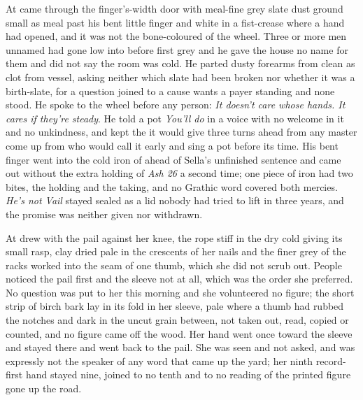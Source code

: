 At   came through the finger's-width door with meal-fine grey slate dust ground small as meal past his bent little finger and white in a fist-crease where a hand had opened, and it was not the bone-coloured  of the wheel. Three or more men unnamed had gone low into  before first grey and he gave the house no name for them and did not say the room was cold. He parted dusty forearms from clean as clot from vessel, asking neither which slate had been broken nor whether it was a birth-slate, for a question joined to a cause wants a payer standing and none stood. He spoke to the wheel before any person: \emph{It doesn't care whose hands. It cares if they're steady}. He told a pot \emph{You'll do} in a voice with no welcome in it and no unkindness, and kept the  it would give three turns ahead from any master come up from  who would call it early and sing a pot before its time. His bent finger went into the cold iron of  ahead of Sella's unfinished sentence and came out without the extra holding of \emph{Ash 26} a second time; one piece of iron had two bites, the holding and the taking, and no Grathic word covered both mercies. \emph{He's not Vail} stayed sealed as a lid nobody had tried to lift in three years, and the promise was neither given nor withdrawn.

At   drew with the pail against her knee, the rope stiff in the dry cold giving its small rasp, clay dried pale in the crescents of her nails and the finer grey of the racks worked into the seam of one thumb, which she did not scrub out. People noticed the pail first and the sleeve not at all, which was the order she preferred. No question was put to her this morning and she volunteered no figure; the short strip of birch bark lay in its fold in her sleeve, pale where a thumb had rubbed the notches and dark in the uncut grain between, not taken out, read, copied or counted, and no figure came off the wood. Her hand went once toward the sleeve and stayed there and went back to the pail. She was seen and not asked, and was expressly not the speaker of any word that came up the yard; her ninth record-first hand stayed nine, joined to no tenth and to no reading of the printed figure gone up the road.

\scenebreak

